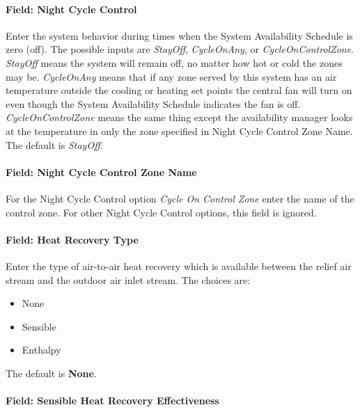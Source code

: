\paragraph{Field: Night Cycle Control}\label{field-night-cycle-control-5}

Enter the system behavior during times when the System Availability Schedule is zero (off). The possible inputs are \emph{StayOff}, \emph{CycleOnAny}, or \emph{CycleOnControlZone}. \emph{StayOff} means the system will remain off, no matter how hot or cold the zones may be. \emph{CycleOnAny} means that if any zone served by this system has an air temperature outside the cooling or heating set points the central fan will turn on even though the System Availability Schedule indicates the fan is off. \emph{CycleOnControlZone} means the same thing except the availability manager looks at the temperature in only the zone specified in Night Cycle Control Zone Name. The default is \emph{StayOff}.

\paragraph{Field: Night Cycle Control Zone Name}\label{field-night-cycle-control-zone-name-5}

For the Night Cycle Control option \emph{Cycle On Control Zone} enter the name of the control zone. For other Night Cycle Control options, this field is ignored.

\paragraph{Field: Heat Recovery Type}\label{field-heat-recovery-type-7}

Enter the type of air-to-air heat recovery which is available between the relief air stream and the outdoor air inlet stream. The choices are:

\begin{itemize}
\item
  None
\item
  Sensible
\item
  Enthalpy
\end{itemize}

The default is \textbf{None}\emph{.}

\paragraph{Field: Sensible Heat Recovery Effectiveness}\label{field-sensible-heat-recovery-effectiveness-7}

